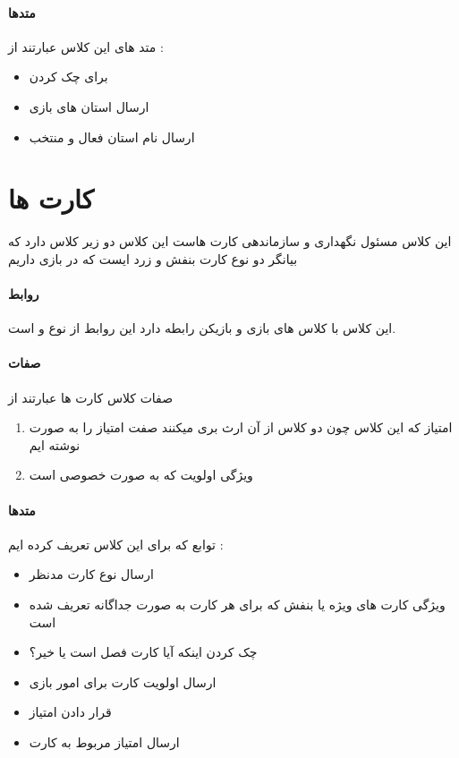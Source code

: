 \documentclass[pdf,titlepage,a4paper]{report}
\begin{document}
	\paragraph{متدها}
	
	متد های این کلاس عبارتند از :

	\begin{itemize}
		\item {} برای چک کردن 
		\item {} ارسال استان های بازی 
		\item {} ارسال نام استان فعال و منتخب
	\end{itemize}
	
	\newpage
	\section{کارت ها}
	این کلاس مسئول نگهداری و سازماندهی کارت هاست این کلاس دو زیر کلاس دارد که بیانگر دو نوع کارت بنفش و زرد ایست که در بازی داریم
    \paragraph{روابط}
    این کلاس با کلاس های بازی و بازیکن رابطه دارد
	این روابط از نوع  و  است.\\
	
	\paragraph{صفات}
	صفات کلاس کارت ها  عبارتند از 
	\begin{enumerate}
		\item امتیاز که این کلاس چون دو کلاس از آن ارث بری میکنند صفت امتیاز را به صورت   نوشته ایم
		\item  ویژگی اولویت که به صورت خصوصی است
	\end{enumerate}

	\paragraph{متدها}
	توابع که برای این کلاس تعریف کرده ایم :

	\begin{itemize}
		\item {} ارسال نوع کارت مدنظر
		\item {} ویژگی کارت های ویژه یا بنفش که برای هر کارت به صورت جداگانه تعریف شده است
		\item {} چک کردن اینکه آیا کارت فصل است یا خیر؟
		\item {} ارسال اولویت کارت برای امور بازی 
		\item {}  قرار دادن امتیاز
		\item {} ارسال امتیاز مربوط به کارت
	\end{itemize}
	
\end{document}
